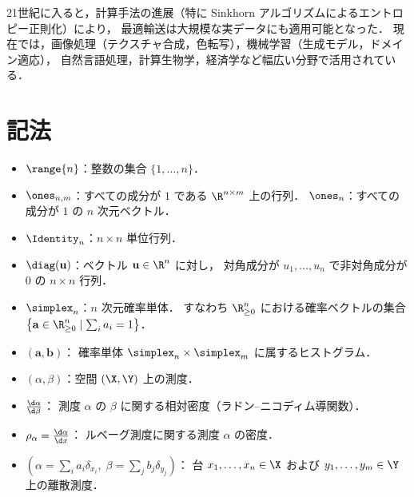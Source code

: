 21世紀に入ると，計算手法の進展（特に Sinkhorn アルゴリズムによるエントロピー正則化）により，
最適輸送は大規模な実データにも適用可能となった．
現在では，画像処理（テクスチャ合成，色転写），機械学習（生成モデル，ドメイン適応），
自然言語処理，計算生物学，経済学など幅広い分野で活用されている．

\section*{記法}
\label{sec:notation}

\begin{itemize}
  \item $\range{n}$：整数の集合 $\{1, \ldots, n\}$．

  \item $\ones_{n,m}$：すべての成分が $1$ である $\R^{n \times m}$ 上の行列．
    $\ones_n$：すべての成分が $1$ の $n$ 次元ベクトル．

  \item $\Identity_n$：$n \times n$ 単位行列．

  \item $\diag(\mathbf{u})$：ベクトル $\mathbf{u} \in \R^n$ に対し，
    対角成分が $u_1, \ldots, u_n$ で非対角成分が $0$ の $n \times n$ 行列．

  \item $\simplex_n$：$n$ 次元確率単体．
    すなわち $\R_{\geq 0}^n$ における確率ベクトルの集合
    $\left\{ \mathbf{a} \in \R_{\geq 0}^n \mid \sum_i a_i = 1 \right\}$．

  \item $(\mathbf{a}, \mathbf{b})$：
    確率単体 $\simplex_n \times \simplex_m$ に属するヒストグラム．

  \item $(\alpha, \beta)$：空間 $(\X, \Y)$ 上の測度．

  \item $\frac{\d\alpha}{\d\beta}$：
    測度 $\alpha$ の $\beta$ に関する相対密度（ラドン--ニコディム導関数）．

  \item $\rho_\alpha = \frac{\d\alpha}{\d x}$：
    ルベーグ測度に関する測度 $\alpha$ の密度．

  \item $\left(\alpha = \sum_i a_i \delta_{x_i},\;
    \beta = \sum_j b_j \delta_{y_j}\right)$：
    台 $x_1, \ldots, x_n \in \X$ および $y_1, \ldots, y_m \in \Y$ 上の離散測度．


\end{itemize}

